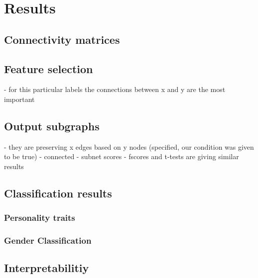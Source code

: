 \documentclass[msthesis.tex]{subfiles}
\begin{document}
\chapter{Results}

\section{Connectivity matrices}

\section{Feature selection}

- for this particular labels the connections between x and y are the most important

\section{Output subgraphs}

- they are preserving x edges based on y nodes (specified, our condition was given to be true)
- connected
- subnet scores
- fscores and t-tests are giving similar results

\section{Classification results}
\subsection{Personality traits}

\subsection{Gender Classification}



\section{Interpretabilitiy}
\end{document}
